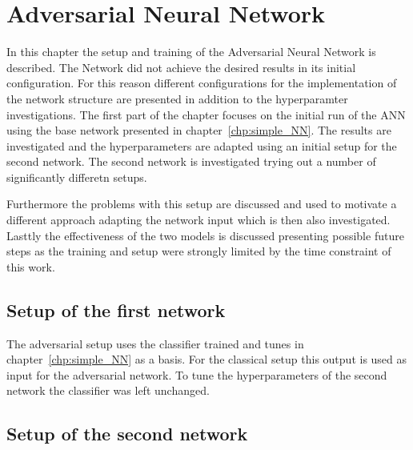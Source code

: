 \chapter{Adversarial Neural Network}
\label{chp:ANN}

In this chapter the setup and training of the Adversarial Neural Network is described. The Network did not achieve the desired results in its initial configuration.
For this reason different configurations for the implementation of the network structure are presented in addition to the hyperparamter investigations.
The first part of the chapter focuses on the initial run of the ANN using the base network presented in chapter~\ref{chp:simple_NN}. The results are investigated and the hyperparameters are adapted using an initial setup for the second network.
The second network is investigated trying out a number of significantly differetn setups.

Furthermore the problems with this setup are discussed and used to motivate a different approach adapting the network input which is then also investigated.
Lasttly the effectiveness of the two models is discussed presenting possible future steps as the training and setup were strongly limited by the time constraint of this work.
\section{Setup of the first network}

The adversarial setup uses the classifier trained and tunes in chapter~\ref{chp:simple_NN} as a basis. For the classical setup this output is used as input for the adversarial network.
To tune the hyperparameters of the second network the classifier was left unchanged. 

\section{Setup of the second network}
